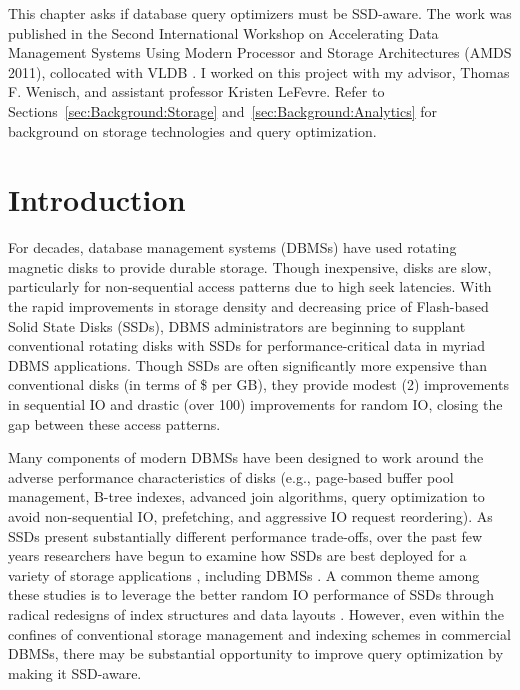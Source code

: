 This chapter asks if database query optimizers must be SSD-aware.
The work was published in the Second International Workshop on Accelerating Data Management Systems Using Modern Processor and Storage Architectures (AMDS 2011), collocated with VLDB \cite{PelleyWenisch11}.
I worked on this project with my advisor, Thomas F. Wenisch, and assistant professor Kristen LeFevre.
Refer to Sections~\ref{sec:Background:Storage} and~\ref{sec:Background:Analytics} for background on storage technologies and query optimization.

\section{Introduction}
\label{sec:FlashOpti:Intro}

For decades, database management systems (DBMSs) have used rotating magnetic disks to provide durable storage.
Though inexpensive, disks are slow, particularly for non-sequential access patterns due to high seek latencies.
With the rapid improvements in storage density and decreasing price of Flash-based Solid State Disks (SSDs), DBMS administrators are beginning to supplant conventional rotating disks with SSDs for performance-critical data in myriad DBMS applications.
Though SSDs are often significantly more expensive than conventional disks (in terms of \$ per GB), they provide modest (2\texttimes) improvements in sequential IO and drastic (over 100\texttimes) improvements for random IO, closing the gap between these access patterns.

Many components of modern DBMSs have been designed to work around the adverse performance characteristics of disks (e.g., page-based buffer pool management, B-tree indexes, advanced join algorithms, query optimization to avoid non-sequential IO, prefetching, and aggressive IO request reordering).  
As SSDs present substantially different performance trade-offs, over the past few years researchers have begun to examine how SSDs are best deployed for a variety of storage applications \cite{Bouganim09uflip:understanding, Chen2009}, including DBMSs \cite{Lee2008, Yin2009, Li2009, Baumann2010, Tsirogiannis2009}.  
A common theme among these studies is to leverage the better random IO performance of SSDs through radical redesigns of index structures \cite{Yin2009, Li2009} and data layouts \cite{Baumann2010, Tsirogiannis2009}. 
However, even within the confines of conventional storage management and indexing schemes in commercial DBMSs, there may be substantial opportunity to improve query optimization by making it SSD-aware.

